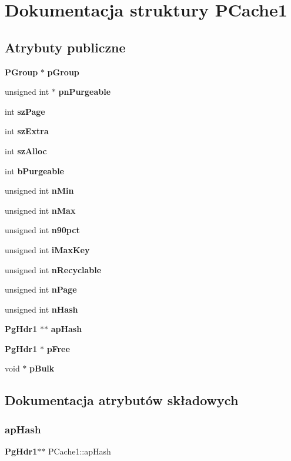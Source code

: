 \section{Dokumentacja struktury P\+Cache1}
\label{struct_p_cache1}
\subsection*{Atrybuty publiczne}
\begin{DoxyCompactItemize}
\item 
\textbf{ P\+Group} $\ast$ \textbf{ p\+Group}
\item 
unsigned int $\ast$ \textbf{ pn\+Purgeable}
\item 
int \textbf{ sz\+Page}
\item 
int \textbf{ sz\+Extra}
\item 
int \textbf{ sz\+Alloc}
\item 
int \textbf{ b\+Purgeable}
\item 
unsigned int \textbf{ n\+Min}
\item 
unsigned int \textbf{ n\+Max}
\item 
unsigned int \textbf{ n90pct}
\item 
unsigned int \textbf{ i\+Max\+Key}
\item 
unsigned int \textbf{ n\+Recyclable}
\item 
unsigned int \textbf{ n\+Page}
\item 
unsigned int \textbf{ n\+Hash}
\item 
\textbf{ Pg\+Hdr1} $\ast$$\ast$ \textbf{ ap\+Hash}
\item 
\textbf{ Pg\+Hdr1} $\ast$ \textbf{ p\+Free}
\item 
void $\ast$ \textbf{ p\+Bulk}
\end{DoxyCompactItemize}


\subsection{Dokumentacja atrybutów składowych}
\mbox{\label{struct_p_cache1_a1169ec7ba2a628d89841d16ced651e1f}} 
\subsubsection{apHash}
{\footnotesize\ttfamily \textbf{ Pg\+Hdr1}$\ast$$\ast$ P\+Cache1\+::ap\+Hash}

\mbox{\label{struct_p_cache1_a2af7d24e27369252addec9bef45afcfc}} 
